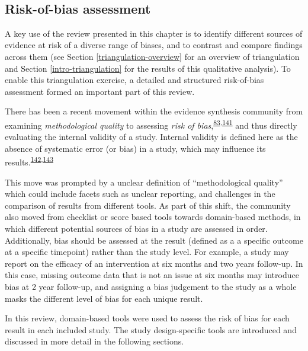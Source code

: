 \documentclass[a4paper, twoside]{templates/ociamthesis}
\begin{document}
~

\hypertarget{risk-of-bias}{%
\subsection{Risk-of-bias assessment}\label{risk-of-bias}}

A key use of the review presented in this chapter is to identify different sources of evidence at risk of a diverse range of biases, and to contrast and compare findings across them (see Section \ref{triangulation-overview} for an overview of triangulation and Section \ref{intro-triangulation} for the results of this qualitative analysis). To enable this triangulation exercise, a detailed and structured risk-of-bias assessment formed an important part of this review.

There has been a recent movement within the evidence synthesis community from examining \emph{methodological quality} to assessing \emph{risk of bias},\textsuperscript{\protect\hyperlink{ref-mcguinness2018}{83},\protect\hyperlink{ref-sterne2016}{141}} and thus directly evaluating the internal validity of a study. Internal validity is defined here as the absence of systematic error (or bias) in a study, which may influence its results.\textsuperscript{\protect\hyperlink{ref-campbell1957}{142},\protect\hyperlink{ref-juni2001}{143}}

This move was prompted by a unclear definition of ``methodological quality'' which could include facets such as unclear reporting, and challenges in the comparison of results from different tools. As part of this shift, the community also moved from checklist or score based tools towards domain-based methods, in which different potential sources of bias in a study are assessed in order. Additionally, bias should be assessed at the result (defined as a a specific outcome at a specific timepoint) rather than the study level. For example, a study may report on the efficacy of an intervention at six months and two years follow-up. In this case, missing outcome data that is not an issue at six months may introduce bias at 2 year follow-up, and assigning a bias judgement to the study as a whole masks the different level of bias for each unique result.

In this review, domain-based tools were used to assess the risk of bias for each result in each included study. The study design-specific tools are introduced and discussed in more detail in the following sections.

~
\end{document}
